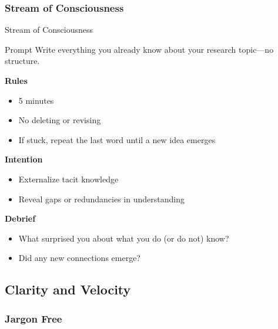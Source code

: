 \documentclass{beamer}
\begin{document}
\subsubsection{Stream of Consciousness}

\begin{frame}{Stream of Consciousness}
\begin{block}{Prompt}
Write everything you already know about your research topic---no structure.
\end{block}

\vspace{0.8em}
\textbf{Rules}
\begin{itemize}
    \item 5 minutes
    \item No deleting or revising
    \item If stuck, repeat the last word until a new idea emerges
\end{itemize}

\textbf{Intention}
\begin{itemize}
    \item Externalize tacit knowledge
    \item Reveal gaps or redundancies in understanding
\end{itemize}

\textbf{Debrief}
\begin{itemize}
    \item What surprised you about what you do (or do not) know?
    \item Did any new connections emerge?
\end{itemize}
\end{frame}

\subsection{Clarity and Velocity}

\subsubsection{Jargon Free}
\end{document}
